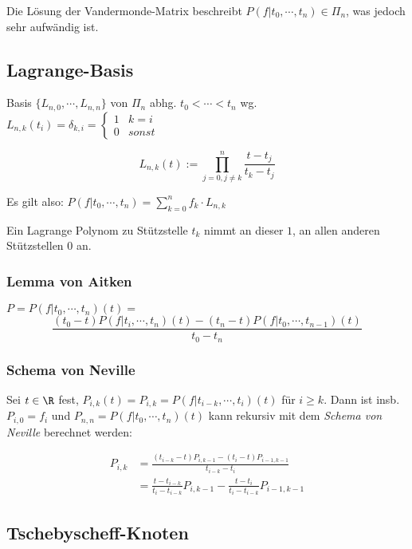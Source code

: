 Die Lösung der Vandermonde-Matrix beschreibt $P(f|t_0,\cdots,t_n) \in \Pi_n$, was jedoch sehr aufwändig ist.

\subsection*{Lagrange-Basis}

Basis $\{L_{n,0},\cdots,L_{n,n}\}$ von $\Pi_n$ abhg. $t_0 < \cdots < t_n$ wg. $L_{n,k}(t_i) = \delta_{k,i} = \begin{cases}1 & k=i \\ 0 & sonst\end{cases}$

$$L_{n,k}(t) := \prod_{j=0,j\neq k}^n \frac{t-t_j}{t_k-t_j}$$

Es gilt also: $P(f|t_0,\cdots,t_n)=\sum_{k=0}^n f_k \cdot L_{n,k}$

\vspace{2mm}

Ein Lagrange Polynom zu Stützstelle $t_k$ nimmt an dieser $1$, an allen anderen Stützstellen $0$ an.

\subsubsection*{Lemma von Aitken}

$P = P(f|t_0,\cdots,t_n)(t) =$
\vspace{-2mm}
$$\frac{(t_0-t)P(f|t_i,\cdots,t_n)(t)-(t_n-t)P(f|t_0,\cdots,t_{n-1})(t)}{t_0-t_n}$$

\subsubsection*{Schema von Neville}

Sei $t \in \R$ fest, $P_{i,k}(t)=P_{i,k}=P(f|t_{i-k},\cdots,t_i)(t)$ für $i\geq k$. Dann ist insb. $P_{i,0}=f_i$ und $P_{n,n}=P(f|t_0,\cdots,t_n)(t)$ kann rekursiv mit dem \emph{Schema von Neville} berechnet werden:

\vspace{-4mm}
\begin{align*}
P_{i,k} &= \frac{(t_{i-k}-t)P_{i,k-1} - (t_i-t)P_{i-1,k-1}}{t_{i-k}-t_i} \\
        &= \frac{t-t_{i-k}}{t_i-t_{i-k}} P_{i,k-1} - \frac{t-t_i}{t_i-t_{i-k}} P_{i-1,k-1}
\end{align*}

\subsection*{Tschebyscheff-Knoten}

